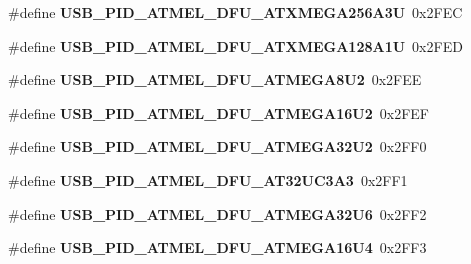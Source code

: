 \begin{DoxyCompactItemize}
\item 
\hypertarget{group__usb__atmel__ids__group_ga1b491076e809556bea90da42d556a4e7}{\#define {\bfseries U\-S\-B\-\_\-\-P\-I\-D\-\_\-\-A\-T\-M\-E\-L\-\_\-\-D\-F\-U\-\_\-\-A\-T\-X\-M\-E\-G\-A256\-A3\-U}~0x2\-F\-E\-C}\label{group__usb__atmel__ids__group_ga1b491076e809556bea90da42d556a4e7}

\item 
\hypertarget{group__usb__atmel__ids__group_ga32e006da9657814df37d3c22dbb4c90c}{\#define {\bfseries U\-S\-B\-\_\-\-P\-I\-D\-\_\-\-A\-T\-M\-E\-L\-\_\-\-D\-F\-U\-\_\-\-A\-T\-X\-M\-E\-G\-A128\-A1\-U}~0x2\-F\-E\-D}\label{group__usb__atmel__ids__group_ga32e006da9657814df37d3c22dbb4c90c}

\item 
\hypertarget{group__usb__atmel__ids__group_ga68f5b8a39ac712a611f1140d80b9b58c}{\#define {\bfseries U\-S\-B\-\_\-\-P\-I\-D\-\_\-\-A\-T\-M\-E\-L\-\_\-\-D\-F\-U\-\_\-\-A\-T\-M\-E\-G\-A8\-U2}~0x2\-F\-E\-E}\label{group__usb__atmel__ids__group_ga68f5b8a39ac712a611f1140d80b9b58c}

\item 
\hypertarget{group__usb__atmel__ids__group_ga208651a2d251f01e52d9b7c51b6f9250}{\#define {\bfseries U\-S\-B\-\_\-\-P\-I\-D\-\_\-\-A\-T\-M\-E\-L\-\_\-\-D\-F\-U\-\_\-\-A\-T\-M\-E\-G\-A16\-U2}~0x2\-F\-E\-F}\label{group__usb__atmel__ids__group_ga208651a2d251f01e52d9b7c51b6f9250}

\item 
\hypertarget{group__usb__atmel__ids__group_gacd8db8dbfd7130716e4bee4606ab8729}{\#define {\bfseries U\-S\-B\-\_\-\-P\-I\-D\-\_\-\-A\-T\-M\-E\-L\-\_\-\-D\-F\-U\-\_\-\-A\-T\-M\-E\-G\-A32\-U2}~0x2\-F\-F0}\label{group__usb__atmel__ids__group_gacd8db8dbfd7130716e4bee4606ab8729}

\item 
\hypertarget{group__usb__atmel__ids__group_gaa11f6d95a0888b0f8defad9cbf78fc65}{\#define {\bfseries U\-S\-B\-\_\-\-P\-I\-D\-\_\-\-A\-T\-M\-E\-L\-\_\-\-D\-F\-U\-\_\-\-A\-T32\-U\-C3\-A3}~0x2\-F\-F1}\label{group__usb__atmel__ids__group_gaa11f6d95a0888b0f8defad9cbf78fc65}

\item 
\hypertarget{group__usb__atmel__ids__group_gaffc46609cff6a77aeb4393e31feaea05}{\#define {\bfseries U\-S\-B\-\_\-\-P\-I\-D\-\_\-\-A\-T\-M\-E\-L\-\_\-\-D\-F\-U\-\_\-\-A\-T\-M\-E\-G\-A32\-U6}~0x2\-F\-F2}\label{group__usb__atmel__ids__group_gaffc46609cff6a77aeb4393e31feaea05}

\item 
\hypertarget{group__usb__atmel__ids__group_ga2d071c4d544362684d714866bcf71543}{\#define {\bfseries U\-S\-B\-\_\-\-P\-I\-D\-\_\-\-A\-T\-M\-E\-L\-\_\-\-D\-F\-U\-\_\-\-A\-T\-M\-E\-G\-A16\-U4}~0x2\-F\-F3}\label{group__usb__atmel__ids__group_ga2d071c4d544362684d714866bcf71543}


\end{DoxyCompactItemize}
